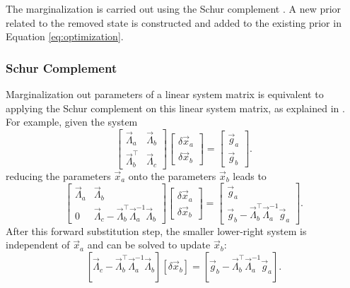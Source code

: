 The marginalization is carried out using the Schur complement 
\cite{sibley2010Slide}. A new prior related to the removed state is constructed 
and added to the existing prior in Equation \eqref{eq:optimization}.

\subsubsection{Schur Complement}
Marginalization out parameters of a linear system matrix is equivalent to 
applying 
the Schur complement on this linear system matrix, as explained in 
\citep{sibley2010Slide}. For example, given the system
\begin{equation}\label{eq:schur_system}
  \begin{bmatrix}
    \vec{\Lambda}_a & \vec{\Lambda}_{b} \\
    \vec{\Lambda}_b^\top & \vec{\Lambda}_c
  \end{bmatrix} 
  \begin{bmatrix}
    \delta \vec{x}_a \\
    \delta \vec{x}_b
  \end{bmatrix} = 
  \begin{bmatrix}
    \vec{g}_a \\
    \vec{g}_b
  \end{bmatrix}.
\end{equation}
reducing the parameters $\vec{x}_a$ onto the parameters $\vec{x}_b$ leads to
\begin{equation}\label{eq:schur_complement}
  \begin{bmatrix}
    \vec{\Lambda}_a & \vec{\Lambda}_{b} \\
    0 & \vec{\Lambda}_c - \vec{\Lambda}_{b}^\top  \vec{\Lambda}_{a}^{-1} 
\vec{\Lambda}_{b}
  \end{bmatrix} 
  \begin{bmatrix}
    \delta \vec{x}_a \\
    \delta \vec{x}_b
  \end{bmatrix} = 
  \begin{bmatrix}
    \vec{g}_a \\
    \vec{g}_b -  \vec{\Lambda}_{b}^\top  \vec{\Lambda}_{a}^{-1} 
\vec{g}_{a}
  \end{bmatrix}.
\end{equation}
After this forward substitution step, the smaller lower-right system is 
independent of $\vec{x}_a$ and can be solved to update $\vec{x}_b$:
\begin{equation}\label{eq:schur_reduced}
\left[\vec{\Lambda}_c - \vec{\Lambda}_{b}^\top  \vec{\Lambda}_{a}^{-1} 
\vec{\Lambda}_{b} \right] \left[ \delta \vec{x}_b \right] = 
\left[ \vec{g}_b - \vec{\Lambda}_{b}^\top  \vec{\Lambda}_{a}^{-1} 
\vec{g}_a \right].
\end{equation}



